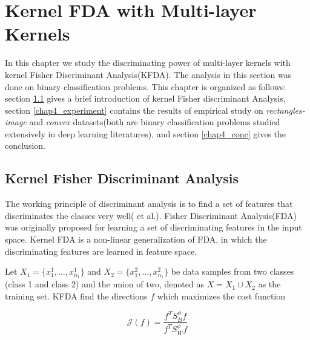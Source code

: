 \chapter{Kernel FDA with Multi-layer Kernels}
\label{chap_kfda}
In this chapter we study the discriminating power of multi-layer kernels with kernel Fisher Discriminant Analysis(KFDA). The analysis in this section was done on binary classification problems. This chapter is organized as follows: section \ref{chap4_kfda} gives a brief introduction of kernel Fisher discriminant Analysis, section \ref{chap4_experiment} contains the results of empirical study on \textit{rectangles-image} and \textit{convex} datasets(both are binary classification problems studied extensively in deep learning literatures), and section \ref{chap4_conc} gives the conclusion.  

\section{Kernel Fisher Discriminant Analysis}
\label{chap4_kfda}
The working principle of discriminant analysis is to find a set of features that discriminates the classes very well(\cite{kfda} et al.). Fisher Discriminant Analysis(FDA) was originally proposed for learning a set of discriminating features in the input space. Kernel FDA is a non-linear generalization of FDA, in which the discriminating features are learned in feature space.

Let $X_1 = \{x_1^1, \ldots, x_{n_1}^1 \}$ and $X_2 = \{x_1^2, \ldots, x_{n_1}^2 \}$ be data samples from two classes (class 1 and class 2) and the union of two, denoted as $X = X_1 \cup X_2$ as the training set.  KFDA find the directions $f$ which maximizes the cost function

\begin{equation}
\mathcal{J}(f) = \frac{f^TS_B^{\phi}f}{f^TS_W^{\phi}f} 
\label{4_jw}
\end{equation}

